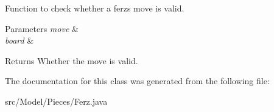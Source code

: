 Function to check whether a ferz\textquotesingle{}s move is valid. 
\begin{DoxyParams}{Parameters}
{\em move} & \\
\hline
{\em board} & \\
\hline
\end{DoxyParams}
\begin{DoxyReturn}{Returns}
Whether the move is valid. 
\end{DoxyReturn}


The documentation for this class was generated from the following file\+:\begin{DoxyCompactItemize}
\item 
src/\+Model/\+Pieces/Ferz.\+java\end{DoxyCompactItemize}
